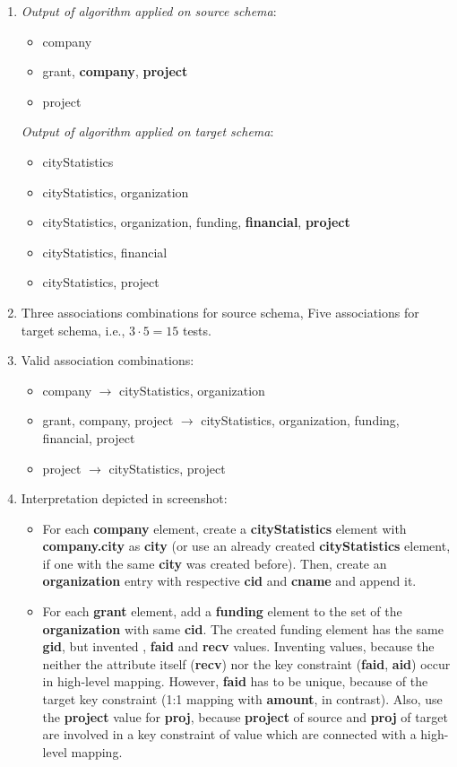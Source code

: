\documentclass{scrartcl}
\begin{document}
\begin{enumerate}
		\item \textit{Output of algorithm applied on source schema}:
		\begin{itemize}
			\item company
			\item grant, \textbf{company}, \textbf{project}
			\item project
		\end{itemize}
		
		\textit{Output of algorithm applied on target schema}:
		\begin{itemize}
			\item cityStatistics
			\item cityStatistics, organization
			\item cityStatistics, organization, funding, \textbf{financial}, \textbf{project}
			\item cityStatistics, financial
			\item cityStatistics, project
		\end{itemize}
		
		\item Three associations combinations for source schema, Five associations for target schema, i.e., $3\cdot5=15$ tests.
		
		\item Valid association combinations:
		\begin{itemize}
			\item company $\to$ cityStatistics, organization
			\item grant, company, project $\to$ cityStatistics, organization, funding, financial, project
			\item project $\to$ cityStatistics, project
		\end{itemize}
		
		\item Interpretation depicted in screenshot:
		\begin{itemize}
			\item For each \textbf{company} element, create a \textbf{cityStatistics} element with \textbf{company.city} as \textbf{city} (or use an already created \textbf{cityStatistics} element, if one with the same \textbf{city} was created before).
			Then, create an \textbf{organization} entry with respective \textbf{cid} and \textbf{cname} and append it.
			
			\item For each \textbf{grant} element, add a \textbf{funding} element to the set of the \textbf{organization} with same \textbf{cid}.
			The created funding element has the same \textbf{gid}, but invented , \textbf{faid} and \textbf{recv} values.
			Inventing values, because the neither the attribute itself (\textbf{recv}) nor the key constraint (\textbf{faid}, \textbf{aid}) occur in high-level mapping.
			However, \textbf{faid} has to be unique, because of the target key constraint (1:1 mapping with \textbf{amount}, in contrast).
			Also, use the \textbf{project} value for \textbf{proj}, because \textbf{project} of source and \textbf{proj} of target are involved in a key constraint of value which are connected with a high-level mapping.
			

\end{itemize}
\end{enumerate}
\end{document}
